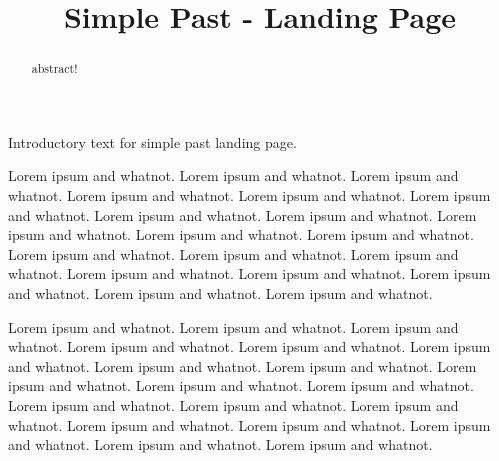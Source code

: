 \documentclass{ximera}
\title{Simple Past - Landing Page}
\begin{document}
\begin{abstract}
abstract!
\end{abstract}
\maketitle

Introductory text for simple past landing page. 

Lorem ipsum and whatnot. Lorem ipsum and whatnot. Lorem ipsum and whatnot. Lorem ipsum and whatnot. Lorem ipsum and whatnot. Lorem ipsum and whatnot. Lorem ipsum and whatnot. Lorem ipsum and whatnot. Lorem ipsum and whatnot. Lorem ipsum and whatnot. Lorem ipsum and whatnot. Lorem ipsum and whatnot. Lorem ipsum and whatnot. Lorem ipsum and whatnot. Lorem ipsum and whatnot. Lorem ipsum and whatnot. Lorem ipsum and whatnot. Lorem ipsum and whatnot. Lorem ipsum and whatnot. 

Lorem ipsum and whatnot. Lorem ipsum and whatnot. Lorem ipsum and whatnot. Lorem ipsum and whatnot. Lorem ipsum and whatnot. Lorem ipsum and whatnot. Lorem ipsum and whatnot. Lorem ipsum and whatnot. Lorem ipsum and whatnot. Lorem ipsum and whatnot. Lorem ipsum and whatnot. Lorem ipsum and whatnot. Lorem ipsum and whatnot. Lorem ipsum and whatnot. Lorem ipsum and whatnot. Lorem ipsum and whatnot. Lorem ipsum and whatnot. Lorem ipsum and whatnot. Lorem ipsum and whatnot. 
\end{document}

